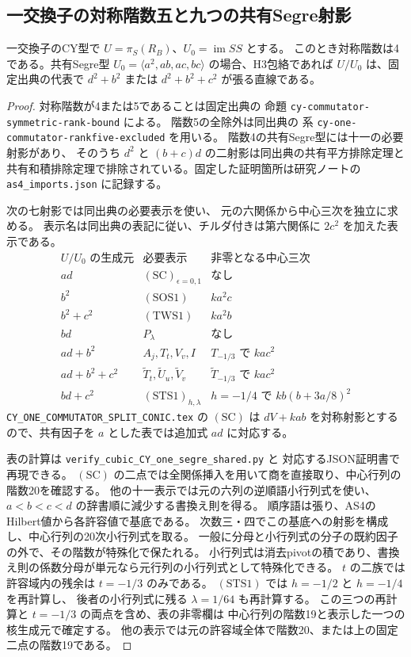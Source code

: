 \subsection{一交換子の対称階数五と九つの共有Segre射影}
\label{subsec:cubic-CY-one-segre-shared}

\begin{proposition}\label{prop:cubic-CY-one-segre-shared-reduction}
一交換子のCY型で $U=\pi_S(R_B)$、$U_0=\operatorname{im}SS$ とする。
このとき対称階数は4である。共有Segre型
$U_0=\langle a^2,ab,ac,bc\rangle$ の場合、H3包絡であれば
$U/U_0$ は、固定出典の代表で $d^2+b^2$ または $d^2+b^2+c^2$ が張る直線である。
\end{proposition}
\begin{proof}
対称階数が4または5であることは固定出典\cite{AS4CYpinned}の
命題 \texttt{cy-commutator-symmetric-rank-bound} による。
階数5の全除外は同出典の
系 \texttt{cy-one-commutator-rankfive-excluded} を用いる。
階数4の共有Segre型には十一の必要射影があり、
そのうち $d^2$ と $(b+c)d$ の二射影は同出典の共有平方排除定理と
共有和積排除定理で排除されている。固定した証明箇所は研究ノートの
\texttt{as4\_imports.json} に記録する。

次の七射影では同出典の必要表示を使い、
元の六関係から中心三次を独立に求める。
表示名は同出典の表記に従い、チルダ付きは第六関係に $2c^2$ を加えた表示である。
\[
\begin{array}{c|l|l}
 U/U_0\text{ の生成元}&\text{必要表示}&\text{非零となる中心三次}\\ \hline
 ad &(\mathrm{SC})_{\epsilon=0,1}&\text{なし}\\
 b^2 &(\mathrm{SOS1})&ka^2c\\
 b^2+c^2 &(\mathrm{TWS1})&ka^2b\\
 bd &P_\lambda&\text{なし}\\
 ad+b^2&A_j,T_t,V_v,I&T_{-1/3}\text{ で }kac^2\\
 ad+b^2+c^2 &\widetilde T_t,\widetilde U_u,\widetilde V_v&
     \widetilde T_{-1/3}\text{ で }kac^2\\
 bd+c^2 &(\mathrm{STS1})_{h,\lambda}&h=-1/4\text{ で }k b(b+3a/8)^2
\end{array}
\]
\texttt{CY\_ONE\_COMMUTATOR\_SPLIT\_CONIC.tex} の $(\mathrm{SC})$ は
$dV+kab$ を対称射影とするので、共有因子を $a$ とした表では追加式 $ad$ に対応する。

表の計算は \texttt{verify\_cubic\_CY\_one\_segre\_shared.py} と
対応するJSON証明書で再現できる。
$(\mathrm{SC})$ の二点では全関係挿入を用いて商を直接取り、中心行列の階数20を確認する。
他の十一表示では元の六列の逆順語小行列式を使い、
$a<b<c<d$ の辞書順に減少する書換え則を得る。
順序語は張り、AS4のHilbert値から各許容値で基底である。
次数三・四でこの基底への射影を構成し、中心行列の20次小行列式を取る。
一般に分母と小行列式の分子の既約因子の外で、その階数が特殊化で保たれる。
小行列式は消去pivotの積であり、書換え則の係数分母が単元なら元行列の小行列式として特殊化できる。
$t$ の二族では許容域内の残余は $t=-1/3$ のみである。
$(\mathrm{STS1})$ では $h=-1/2$ と $h=-1/4$ を再計算し、
後者の小行列式に残る $\lambda=1/64$ も再計算する。
この三つの再計算と $t=-1/3$ の両点を含め、表の非零欄は
中心行列の階数19と表示した一つの核生成元で確定する。
他の表示では元の許容域全体で階数20、または上の固定二点の階数19である。


\end{proof}
